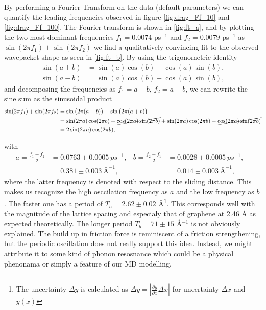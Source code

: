 By performing a Fourier Transform on the data (default parameters) we can quantify the leading frequencies observed in figure \cref{fig:drag_Ff_10} and \cref{fig:drag_Ff_100}. The Fourier transform is shown in \cref{fig:ft_a}, and by plotting the two most dominant frequencies $f_1 = 0.0074$ ps$^{-1}$ and $f_2 = 0.0079$ ps$^{-1}$ as $\sin{(2\pi f_1)} + \sin{(2\pi f_2)}$ we find a qualitatively convincing fit to the observed wavepacket shape as seen in \cref{fig:ft_b}. By using the trigonometric identity
\begin{align*}
\sin (a+b) &= \sin (a) \cos (b) + \cos (a) \sin (b), \\
\sin (a-b) &= \sin (a) \cos (b) - \cos (a) \sin (b),
\end{align*}
and decomposing the frequencies as $f_1 = a - b$, $f_2 = a + b$, we can rewrite the sine sum as the sinusoidal product
\begin{align*}
  \sin(2\pi f_1) + \sin(2\pi f_2) &= \sin\big(2\pi (a - b)\big) + \sin\big(2\pi (a + b)\big) \\
  &= \sin(2\pi a)\cos(2\pi b) + \cancel{\cos(2\pi a)\sin(2\pi b)} + \sin(2\pi a)\cos(2\pi b) - \cancel{\cos(2\pi a)\sin(2\pi b)} \\
  &= 2 \sin(2\pi a) \cos(2\pi b),
\end{align*} 

with 
\begin{align*}
  a = \frac{f_1 + f_2}{2} &= 0.0763 \pm \SI{0.0005}{ps^{-1}},& 
  b = \frac{f_2 - f_1}{2} &= 0.0028 \pm \SI{0.0005}{ps^{-1}},& \\
  &= 0.381 \pm \SI{0.003}{{\text{Å}}^{-1}},& 
  &= 0.014 \pm \SI{0.003}{{\text{Å}}^{-1}},& 
\end{align*}
where the latter frequency is denoted with respect to the sliding distance. This
makes us recognize the high osccilation frequency as $a$ and the low frequency
as $b$. The faster one has a period of $T_a = 2.62 \pm 0.02$ Å\footnote{The
uncertainty $\Delta y$ is calculated as $\Delta y = \left|\frac{\partial
y}{\partial x} \Delta x \right|$ for uncertainty $\Delta x$ and $y(x)$}. This
corresponds well with the magnitude of the lattice spacing and especialy that of
graphene at 2.46 Å as expected theoretically. The longer period $T_b = 71 \pm
15$ Å$^{-1}$ is not obviously explained. The build up in friction force is
reminiscent of a friction strengthening, but the periodic oscillation does not
really support this idea. Instead, we might attribute it to some kind of phonon
resosnance which could be a physical phenonama or simply a feature of our
\acrshort{MD} modelling. 

